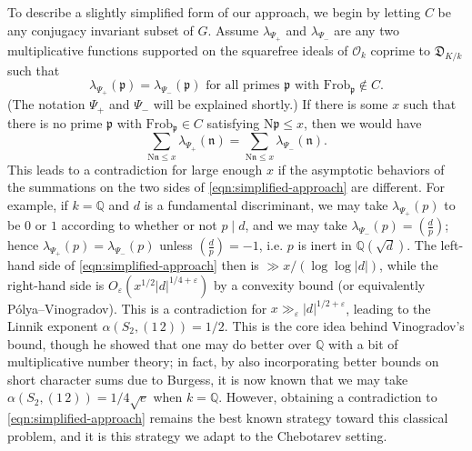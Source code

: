 \documentclass[12pt]{amsart}
\theoremstyle{definition} \newtheorem{definition}[theorem]{Definition}
\theoremstyle{example} \newtheorem{example}[theorem]{Example}
\theoremstyle{remark} \newtheorem{remark}{Remark}[theorem]
\numberwithin{equation}{section}
\numberwithin{theorem}{section}
\renewcommand{\epsilon}{\varepsilon}
\renewcommand{\leq}{\leqslant}
\newcommand{\N}{\mathrm{N}} %
\begin{document}
	To describe a slightly simplified form of our approach, we begin by letting $C$ be any conjugacy invariant subset of $G$. Assume $\lambda_{\Psi_+}$ and $\lambda_{\Psi_-}$ are any two multiplicative functions supported on the squarefree ideals of $\mathcal{O}_k$ coprime to $\mathfrak{D}_{K/k}$ such that 
	\begin{equation}
		\label{eqn:simplified-constraint}
	\lambda_{\Psi_+}(\mathfrak{p}) = \lambda_{\Psi_-}(\mathfrak{p}) \text{ for all primes $\mathfrak{p}$ with $\mathrm{Frob}_\mathfrak{p} \not\in C$.}
	\end{equation}
	(The notation $\Psi_+$ and $\Psi_-$ will be explained shortly.) If there is some $x$ such that there is no prime $\mathfrak{p}$ with $\mathrm{Frob}_\mathfrak{p} \in C$ satisfying $\N\mathfrak{p} \leq x$, then we would have  
	\begin{equation}\label{eqn:simplified-approach}
			\sum_{\N\mathfrak{n} \leq x} \lambda_{\Psi_+}(\mathfrak{n}) 
				= \sum_{\N\mathfrak{n} \leq x} \lambda_{\Psi_-}(\mathfrak{n}).
	\end{equation}
	This leads to a contradiction for large enough $x$ if the asymptotic behaviors of the summations on the two sides of \eqref{eqn:simplified-approach} are different.  For example, if $k = \mathbb{Q}$ and $d$ is a fundamental discriminant, we may take $\lambda_{\Psi_+}(p)$ to be $0$ or $1$ according to whether or not $p \mid d$, and we may take $\lambda_{\Psi_-}(p) = (\frac{d}{p})$; hence $\lambda_{\Psi_+}(p) = \lambda_{\Psi_-}(p)$ unless $(\frac{d}{p}) = -1$, i.e. $p$ is inert in $\mathbb{Q}(\sqrt{d})$.  The left-hand side of \eqref{eqn:simplified-approach} then is $\gg x / (\log\log |d|)$, while the right-hand side is $O_{\epsilon}(x^{1/2} |
	d|^{1/4+\epsilon})$ by a convexity bound (or equivalently P\'olya--Vinogradov).  This is a contradiction for $x \gg_\epsilon |d|^{1/2+\epsilon}$, leading to the Linnik exponent $\alpha(S_2, (1\,2)) = 1/2$.  This is the core idea behind Vinogradov's bound, though he showed that one may do better over $\mathbb{Q}$ with a bit of multiplicative number theory; in fact, by also incorporating better bounds on short character sums due to Burgess, it is now known that we may take $\alpha(S_2,(1\, 2)) = 1/4\sqrt{e}$ when $k=\mathbb{Q}$.  However, obtaining a contradiction to \eqref{eqn:simplified-approach} remains the best known strategy toward this classical problem, and it is this strategy we adapt to the Chebotarev setting.
	
\end{document}
